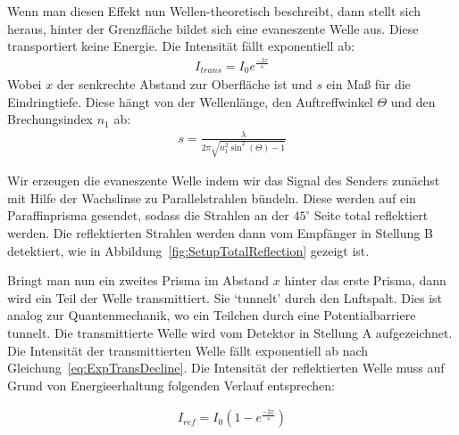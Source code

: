\documentclass[a4paper,10pt,twocolumn]{article}
\begin{document}
    Wenn man diesen Effekt nun Wellen-theoretisch beschreibt, dann stellt sich heraus, hinter der Grenzfläche
    bildet sich eine evaneszente Welle aus.
    Diese transportiert keine Energie.
    Die Intensität fällt exponentiell ab:
    \begin{align}
        \label{eq:ExpTransDecline}
        I_{trans} = I_0 e^{\frac{-2x}{s}} 
    \end{align}
    Wobei $x$ der senkrechte Abstand zur Oberfläche ist und $s$ ein Maß für die Eindringtiefe.
    Diese hängt von der Wellenlänge, den Auftreffwinkel $\Theta$ und den Brechungsindex $n_1$ ab:
    \begin{align}
        s = \frac{\lambda}{2 \pi \sqrt {n_1^2 \sin^2(\Theta) - 1}}
    \end{align}
    
    Wir erzeugen die evaneszente Welle indem wir das Signal des Senders zunächst mit Hilfe der
    Wachslinse zu Parallelstrahlen bündeln.
    Diese werden auf ein Paraffinprisma gesendet, sodass die Strahlen an der $45^{\circ}$ Seite
    total reflektiert werden.
    Die reflektierten Strahlen werden dann vom Empfänger in Stellung B detektiert, wie in
    Abbildung~\ref{fig:SetupTotalReflection} gezeigt ist.
    
    Bringt man nun ein zweites Prisma im Abstand $x$ hinter das erste Prisma, dann wird ein Teil der Welle
    transmittiert.
    Sie `tunnelt' durch den Luftspalt.
    Dies ist analog zur Quantenmechanik, wo ein Teilchen durch eine Potentialbarriere tunnelt.
    Die transmittierte Welle wird vom Detektor in Stellung A aufgezeichnet.
    Die Intensität der transmittierten Welle fällt exponentiell ab nach Gleichung~\eqref{eq:ExpTransDecline}.
    Die Intensität der reflektierten Welle muss auf Grund von Energieerhaltung 
    folgenden Verlauf entsprechen:
    
    \begin{align*}
        I_{ref} = I_0 (1 - e^{\frac{-2x}{s}})
    \end{align*}
    
    
\end{document}
